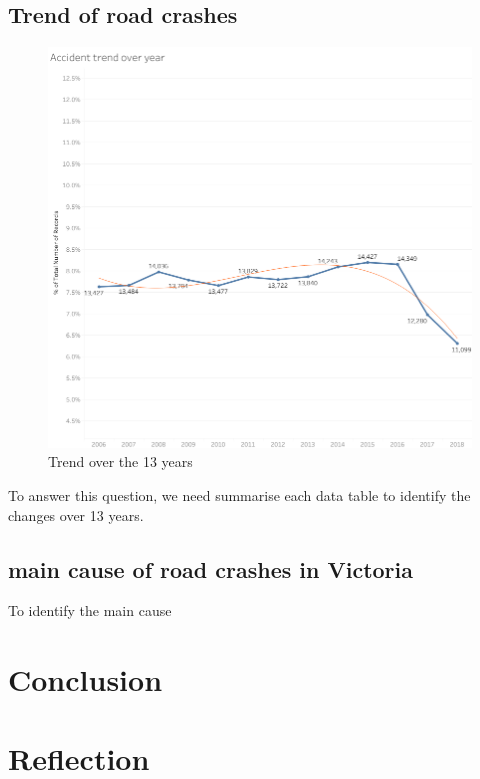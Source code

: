 \documentclass[11pt]{article}
\theoremstyle{definition}
\begin{document}
\subsection{Trend of road crashes}
\begin{figure}
	\vspace{-20pt}
	\begin{center}
	\includegraphics[width=0.9\linewidth]{images/trend_year.png}
	\end{center}
	\caption{Trend over the 13 years}
	\vspace{-0pt}
\label{fig:Trend over 13 years}
\end{figure}	
To answer this question, we need summarise each data table to identify the changes over 13 years. 



\subsection{main cause of road crashes in Victoria}
To identify the main cause 

\section{Conclusion}

\section{Reflection}
\end{document}
